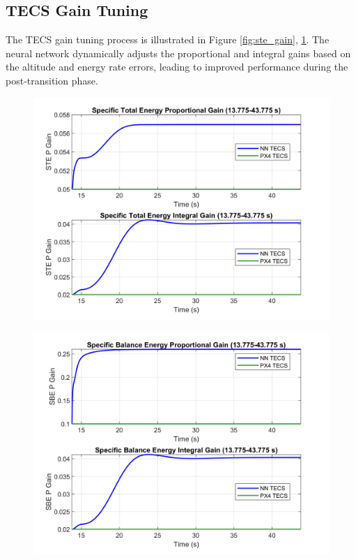 \documentclass[journal,article,submit,pdftex,moreauthors]{Definitions/mdpi}
\begin{document}
\subsection{TECS Gain Tuning}
The TECS gain tuning process is illustrated in Figure \ref{fig:ste_gain}, \ref{fig:sbe_gain}. The neural network dynamically adjusts the proportional and integral gains based on the altitude and energy rate errors, leading to improved performance during the post-transition phase.
\begin{figure}[H]
    \centering
    \begin{minipage}{0.45\textwidth}
        \centering
        \includegraphics[width=\linewidth]{ste_gain.png}
        \label{fig:ste_gain}
    \end{minipage}
    \hfill
    \begin{minipage}{0.45\textwidth}
        \centering
        \includegraphics[width=\linewidth]{sbe_gain.png}
        \label{fig:sbe_gain}
    \end{minipage}
\end{figure}
\end{document}
